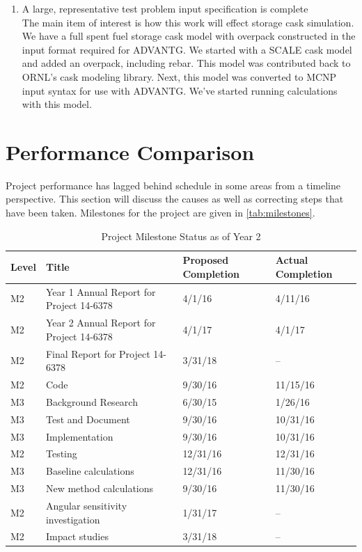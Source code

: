 \documentclass[12pt]{article}
\newcommand{\yr}{2}
\begin{document}
\begin{enumerate}
 
\item A large, representative test problem input specification is complete\\
The main item of interest is how this work will effect storage cask simulation. 
We have a full spent fuel storage cask model with overpack constructed in the input format required for ADVANTG. 
We started with a SCALE cask model and added an overpack, including rebar. 
This model was contributed back to ORNL's cask modeling library. 
Next, this model was converted to MCNP input syntax for use with ADVANTG.
We've started running calculations with this model.
\end{enumerate}


\section{Performance Comparison}
\label{sect::perf-comp} 
Project performance has lagged behind schedule in some areas from a timeline perspective.
This section will discuss the causes as well as correcting steps that have been taken.
Milestones for the project are given in \autoref{tab:milestones}.
\begin{table}[h!]
\begin{center}
\caption{Project Milestone Status as of Year \yr}
\begin{tabular}{ | l | l | l | l | }
\hline
\textbf{Level} & \textbf{Title} & \textbf{Proposed Completion} & \textbf{Actual Completion} \\ \hline
M2 & Year 1 Annual Report for Project 14-6378 & 4/1/16 & 4/11/16 \\
M2 & Year 2 Annual Report for Project 14-6378 & 4/1/17 & 4/1/17 \\ 
M2 & Final Report for Project 14-6378 & 3/31/18 & -- \\ \hline
M2 & Code & 9/30/16 & 11/15/16 \\
M3 & Background Research & 6/30/15 & 1/26/16 \\
M3 & Test and Document & 9/30/16 & 10/31/16 \\
M3 & Implementation & 9/30/16 & 10/31/16 \\  \hline
M2 & Testing & 12/31/16 & 12/31/16 \\
M3 & Baseline calculations & 12/31/16 & 11/30/16 \\
M3 & New method calculations & 9/30/16 & 11/30/16 \\ \hline
M2 & Angular sensitivity investigation & 1/31/17 & -- \\ \hline
M2 & Impact studies & 3/31/18 & -- \\
\hline
\end{tabular}
\label{tab:milestones}
\end{center}
\end{table}
\end{document}
